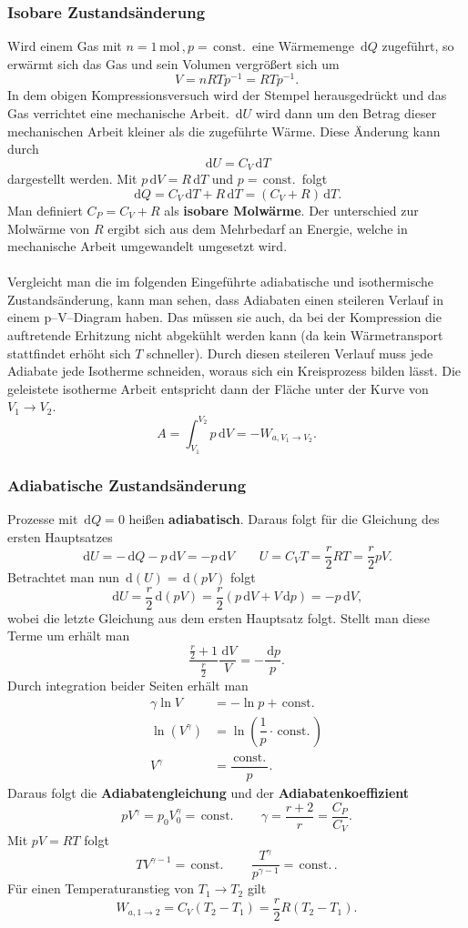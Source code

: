 \documentclass[a4paper,12pt]{article}
\newcommand{\td}{\,\text{d}}
\begin{document}
\subsubsection{Isobare Zustandsänderung}
Wird einem Gas mit $n=1\,\text{mol}\,,p=\,\text{const.}\,$ eine Wärmemenge $\td Q$ zugeführt, so erwärmt sich das Gas und sein Volumen vergrößert sich um
\[ 
        V=nRTp^{-1}=RTp^{-1}
.\] 
In dem obigen Kompressionsversuch wird der Stempel herausgedrückt und das Gas verrichtet eine mechanische Arbeit. $\td U$ wird dann um den Betrag dieser mechanischen Arbeit kleiner als die zugeführte Wärme. Diese Änderung kann durch
\[ 
        \td U=C_V\td T
\] 
dargestellt werden. Mit $p\td V=R\td T$ und $p=\,\text{const.}\,$ folgt
\[ 
        \td Q=C_V\td T+R\td T=\left(C_V+R\right)\td T
.\] 
Man definiert $C_P=C_V+R$ als \textbf{isobare Molwärme}. Der unterschied zur Molwärme von $R$ ergibt sich aus dem Mehrbedarf an Energie, welche in mechanische Arbeit umgewandelt umgesetzt wird. \\\\
Vergleicht man die im folgenden Eingeführte adiabatische und isothermische Zustandsänderung, kann man sehen, dass Adiabaten einen steileren Verlauf in einem p--V--Diagram haben. Das müssen sie auch, da bei der Kompression die auftretende Erhitzung nicht abgekühlt werden kann (da kein Wärmetransport stattfindet erhöht sich $T$ schneller). Durch diesen steileren Verlauf muss jede Adiabate jede Isotherme schneiden, woraus sich ein Kreisprozess bilden lässt. Die geleistete isotherme Arbeit entspricht dann der Fläche unter der Kurve von $V_1\rightarrow V_2$.
\[ 
        A=\int_{V_1}^{V_2}p\td V=-W_{a,V_1\rightarrow V_2}
.\] 

\subsubsection{Adiabatische Zustandsänderung}
Prozesse mit $\td Q=0$ heißen \textbf{adiabatisch}. Daraus folgt für die Gleichung des ersten Hauptsatzes
\[ 
        \td U=-\td Q-p\td V=-p\td V\qquad U=C_VT=\dfrac{r}{2}RT=\dfrac{r}{2}pV
.\] 
Betrachtet man nun $\td(U)=\td(pV)$ folgt
\[ 
        \td U=\dfrac{r}{2}\td(pV)=\dfrac{r}{2}(p\td V+V\td p)=-p\td V
,\] 
wobei die letzte Gleichung aus dem ersten Hauptsatz folgt. Stellt man diese Terme um erhält man
\[ 
        \dfrac{\tfrac{r}{2}+1}{\tfrac{r}{2}}\dfrac{\td V}{V}=-\dfrac{\td p}{p}
.\] 
Durch integration beider Seiten erhält man
\begin{align*}
        \gamma \ln V&=-\ln p+\,\text{const.}\,\\
        \ln \left(V^\gamma \right)&=\ln\left(\dfrac{1}{p}\cdot \,\text{const.}\,\right)\\
        V^\gamma &=\dfrac{\,\text{const.}\,}{p}
.\end{align*}
Daraus folgt die \textbf{Adiabatengleichung} und der \textbf{Adiabatenkoeffizient}
\[ 
        pV^\gamma =p_0V_0^\gamma =\,\text{const.}\,\qquad \gamma =\dfrac{r+2}{r}=\dfrac{C_P}{C_V}
.\] 
Mit $pV=RT$ folgt
\[ 
        TV^{\gamma -1}=\,\text{const.}\,\qquad \dfrac{T^\gamma }{p^{\gamma -1}}=\,\text{const.}\,
.\] 
Für einen Temperaturanstieg von $T_1\rightarrow T_2$ gilt
\[ 
        W_{a,1\rightarrow 2}=C_V(T_2-T_1)=\dfrac{r}{2}R(T_2-T_1)
.\] 
\end{document}
